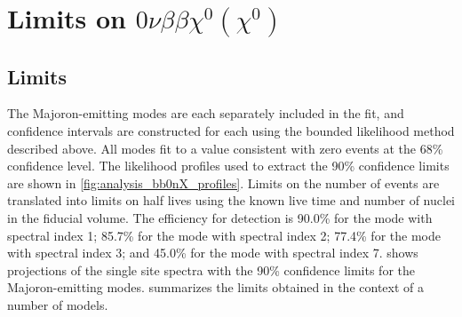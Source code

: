 \documentclass[herrin-thesis.tex]{subfiles}
\begin{document}
\section{Limits on \(0\nu\beta\beta\chi^0(\chi^0)\)}
\subsection{Limits}
The Majoron-emitting modes are each separately included in the fit, and confidence intervals are constructed for each using the bounded likelihood method described above. All modes fit to a value consistent with zero events at the 68\% confidence level. The likelihood profiles used to extract the 90\% confidence limits are shown in \cref{fig:analysis_bb0nX_profiles}. Limits on the number of events are translated into limits on half lives using the known live time and number of  nuclei in the fiducial volume. The efficiency for detection is 90.0\% for the mode with spectral index 1; 85.7\% for the mode with spectral index 2; 77.4\% for the mode with spectral index 3; and 45.0\% for the mode with spectral index 7.  shows projections of the single site spectra with the 90\% confidence limits for the Majoron-emitting modes.  summarizes the limits obtained in the context of a number of models.
\end{document}
